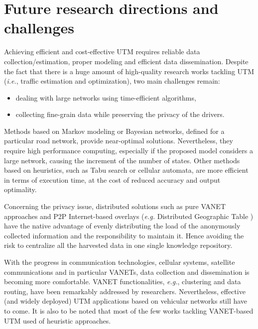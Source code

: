 \documentclass[10pt,onecolumn]{article}
\begin{document}
\section{Future research directions and challenges}
\label{model}

Achieving efficient and cost-effective UTM requires reliable data collection/estimation, proper modeling and efficient data dissemination.
Despite the fact that there is a huge amount of high-quality research works tackling UTM (\textit{i.e.}, traffic estimation and optimization), two main challenges remain:
\begin{itemize}
 \item dealing with large networks using time-efficient algorithms,
 \item collecting fine-grain data while preserving the privacy of the drivers.
\end{itemize}

Methods based on Markov modeling or Bayesian networks, defined for a particular road network, provide near-optimal solutions. 
Nevertheless, they require high performance computing, especially if the proposed model considers a large network, causing the increment of the number of states.  
Other methods based on heuristics, such as Tabu search or cellular automata, are more efficient in terms of execution time, at the cost of reduced accuracy and output optimality.

Concerning the privacy issue, distributed solutions such as pure VANET approaches and P2P Internet-based overlays (\textit{e.g.} Distributed Geographic Table  \cite{Picone2011a}) have the native advantage of evenly distributing the load of the anonymously collected information and the responsibility to maintain it.
Hence avoiding the risk to centralize all the harvested data in one single knowledge repository.

With the progress in communication technologies, cellular systems, satellite communications and in particular VANETs, data collection and dissemination is becoming more comfortable.
VANET functionalities, \textit{e.g.}, clustering and data routing, have been remarkably addressed by researchers. 
Nevertheless, effective (and widely deployed) UTM applications based on vehicular networks still have to come.
It is also to be noted that most of the few works tackling VANET-based UTM \cite{Chen2006} \cite{Jerbi2007} \cite{Garelli2011} used of heuristic approaches.
\end{document}
